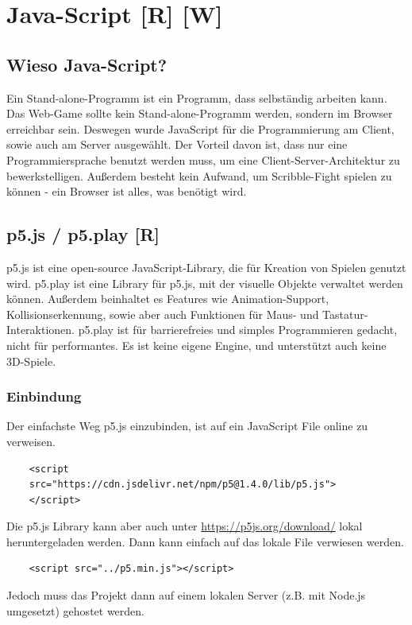 
\section{Java-Script [R] [W]}
\subsection{Wieso Java-Script?}
Ein Stand-alone-Programm ist ein Programm, dass selbständig arbeiten kann.
Das Web-Game sollte kein Stand-alone-Programm werden, sondern im Browser erreichbar sein. Deswegen wurde JavaScript für die Programmierung am Client, sowie auch am Server ausgewählt.
Der Vorteil davon ist, dass nur eine Programmiersprache benutzt werden muss, um eine Client-Server-Architektur zu bewerkstelligen.
Außerdem besteht kein Aufwand, um Scribble-Fight spielen zu können - ein Browser ist alles, was benötigt wird.
\subsection{p5.js / p5.play [R]}
\label{subsection:p5js}\cite{p5js}
p5.js ist eine open-source JavaScript-Library, die für Kreation von Spielen genutzt wird.
p5.play ist eine Library für p5.js, mit der visuelle Objekte verwaltet werden können. Außerdem beinhaltet es Features wie Animation-Support,
Kollisionserkennung, sowie aber auch Funktionen für Maus- und Tastatur-Interaktionen.
p5.play ist für barrierefreies und simples Programmieren gedacht, nicht für performantes.
Es ist keine eigene Engine, und unterstützt auch keine 3D-Spiele.

\subsubsection{Einbindung}
Der einfachste Weg p5.js einzubinden, ist auf ein JavaScript File online zu verweisen.

\begin{lstlisting}
    <script 
    src="https://cdn.jsdelivr.net/npm/p5@1.4.0/lib/p5.js">
    </script>
\end{lstlisting}
Die p5.js Library kann aber auch
unter \url{https://p5js.org/download/} lokal heruntergeladen werden.
Dann kann einfach auf das lokale File verwiesen werden.

\begin{lstlisting}
    <script src="../p5.min.js"></script>
\end{lstlisting}

Jedoch muss das Projekt dann auf einem lokalen Server (z.B. mit Node.js umgesetzt) gehostet werden.

